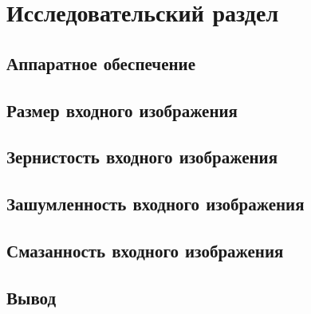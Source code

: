 \chapter{Исследовательский раздел}

\section{Аппаратное обеспечение}

\section{Размер входного изображения}

\section{Зернистость входного изображения}

\section{Зашумленность входного изображения}

\section{Смазанность входного изображения}

\section{Вывод}